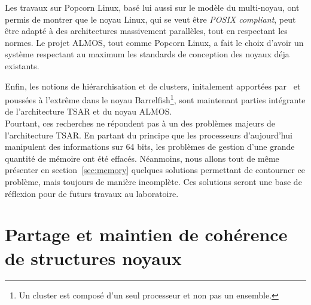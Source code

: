       Les travaux sur Popcorn Linux, basé lui aussi sur le modèle du
      multi-noyau, ont permis de montrer que le noyau Linux, qui se veut être
      \textit{POSIX compliant}, peut être adapté à des architectures massivement
      parallèles, tout en respectant les normes. Le projet ALMOS, tout comme
      Popcorn Linux, a fait le choix d'avoir un système respectant au maximum
      les standards de conception des noyaux déja existants.

      Enfin, les notions de hiérarchisation et de clusters, initalement
      apportées par~\citet{unrau1995hierarchical} et poussées à l'extrême dans
      le noyau Barrelfish\footnote{Un cluster est composé d'un seul processeur
        et non pas un ensemble.}, sont maintenant parties intégrante de
      l'architecture TSAR et du noyau ALMOS.\\

      Pourtant, ces recherches ne répondent pas à un des problèmes majeurs de
      l'architecture TSAR. En partant du principe que les processeurs
      d'aujourd'hui manipulent des informations sur 64 bits, les problèmes de
      gestion d'une grande quantité de mémoire ont été effacés. Néanmoins, nous
      allons tout de même présenter en section~\ref{sec:memory} quelques
      solutions permettant de contourner ce problème, mais toujours de manière
      incomplète. Ces solutions seront une base de réflexion pour de futurs
      travaux au laboratoire.
    
     



  \section{Partage et maintien de cohérence de structures noyaux}
  \label{sec:consistency}
  





